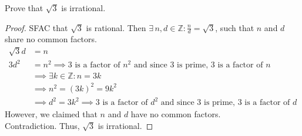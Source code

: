 \documentclass{article}
\begin{document}
Prove that $\sqrt{3}$ is irrational.

\begin{proof}
    SFAC that $\sqrt{3}$ is rational.  Then $\exists \, n,d \in \mathbb{Z} :
    \frac{n}{d} = \sqrt{3}$, such that $n$ and $d$ share no common factors.
    \begin{align*}
        \sqrt{3}d &= n \\
        3d^2 &= n^2 \implies \text{$3$ is a factor of $n^2$ and since $3$ is
        prime, 3 is a factor of $n$} \\
        &\implies \exists k \in \mathbb{Z} : n = 3k \\
        &\implies n^2 = (3k)^2 = 9k^2 \\
        &\implies d^2 = 3k^2 \implies \text{$3$ is a factor of $d^2$ and since
        $3$ is prime, $3$ is a factor of $d$}
    \end{align*}
    However, we claimed that $n$ and $d$ have no common factors. \\
    Contradiction. Thus, $\sqrt{3}$ is irrational.  
\end{proof}
\end{document}
